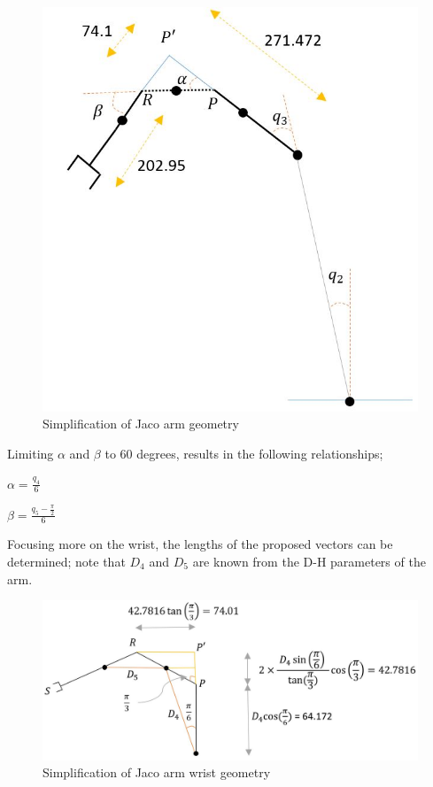 \documentclass[12pt,openany,a4paper]{book}
\begin{document}
\begin{center}
\begin{figure}[htb]
  \includegraphics[width=0.8\linewidth]{jaco_inv_figure.jpg}
\caption{Simplification of Jaco arm geometry}
\end{figure}
\end{center}

Limiting $\alpha$ and $\beta$ to 60 degrees, results in the following relationships;

$\alpha = \frac{q_4}{6}$

$\beta	= \frac{q_5 - \frac{\pi}{2}}{6}$

Focusing more on the wrist, the lengths of the proposed vectors can be determined; note that $D_4$ and $D_5$ are known from the D-H parameters of the arm.

\begin{center}
\begin{figure}[htb]
  \includegraphics[width=0.9\linewidth]{jaco_inv_wrist_figure.jpg}
\caption{Simplification of Jaco arm wrist geometry}
\end{figure}
\end{center}
\end{document}
